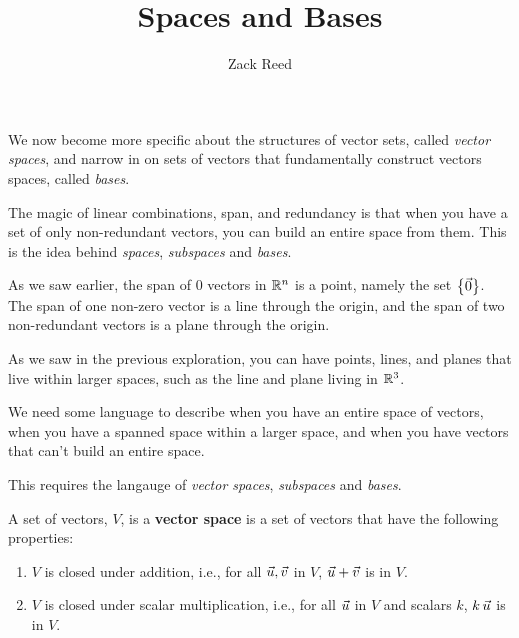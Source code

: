 \documentclass{ximera}
\author{Zack Reed}
\title{Spaces and Bases}
\begin{document}
\begin{abstract}

\end{abstract}
\maketitle

We now become more specific about the structures of vector sets, called \emph{vector spaces}, and narrow in on sets of vectors that fundamentally construct vectors spaces, called \emph{bases}.

\begin{exploration}
  
  The magic of linear combinations, span, and redundancy is that when you have a set of only non-redundant vectors, you can build an entire space from them. This is the idea behind \emph{spaces}, \emph{subspaces} and \emph{bases}. 

  As we saw earlier, the span of 0 vectors in $\mathbb{R}^n$ is a point, namely the set $\left\{\vec{0}\right\}$. The span of one non-zero vector is a line
through the origin, and the span of two non-redundant vectors
is a plane through the origin.

As we saw in the previous exploration, you can have points, lines, and planes that live within larger spaces, such as the line and plane living in $\mathbb{R}^3$.

We need some language to describe when you have an entire space of vectors, when you have a spanned space within a larger space, and when you have vectors that can't build an entire space.

This requires the langauge of \emph{vector spaces}, \emph{subspaces} and \emph{bases}.



  \begin{definition}

    A set of vectors, $V$, is a \textbf{vector space} is a set of vectors that have the following properties:

    \begin{enumerate}
    
      \item $V$ is closed under addition, i.e., for all $\vec{u},\vec{v}$ in $V$, $\vec{u}+\vec{v}$ is in $V$.
      
      \item $V$ is closed under scalar multiplication, i.e., for all $\vec{u}$ in $V$ and scalars $k$, $k\,\vec{u}$ is in $V$.
      

\end{enumerate}
\end{definition}
\end{exploration}
\end{document}
